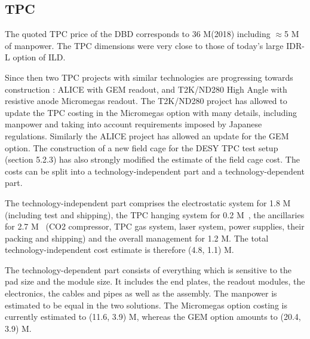 \subsection{TPC}
The quoted TPC price of the DBD corresponds to 36 M\texteuro(2018) including $\approx$5 M\texteuro~ of manpower. The TPC dimensions  were very close to those of today's large IDR-L option of ILD.


Since then two TPC projects with similar technologies are progressing towards construction : ALICE with GEM readout, and T2K/ND280 High Angle with resistive anode Micromegas readout. The T2K/ND280 project has allowed to update the TPC costing in the Micromegas option with many details, including manpower and taking into account requirements imposed by Japanese regulations. Similarly the ALICE project has allowed an update for the GEM option. The construction of a new field cage for the DESY TPC test setup (section 5.2.3) has also strongly modified the estimate of the field cage cost. The costs can be split into a technology-independent part and a technology-dependent part.

The technology-independent part comprises the electrostatic system for 1.8 M\texteuro~ (including test and shipping), the TPC hanging system for 0.2 M\texteuro~, the ancillaries for 2.7 M\texteuro~ (CO2 compressor, TPC gas system, laser system, power supplies, their packing and shipping) and the overall management for 1.2 M\texteuro. The total technology-independent cost estimate is therefore (4.8, 1.1) M\texteuro.

The technology-dependent part consists of everything which is sensitive to the pad size and the module size. It includes the end plates, the readout modules, the electronics, the cables and pipes as well as the assembly. The manpower is estimated to be equal in the two solutions. The Micromegas option costing is currently estimated to (11.6, 3.9) M\texteuro, whereas the GEM option amounts to (20.4, 3.9) M\texteuro.

